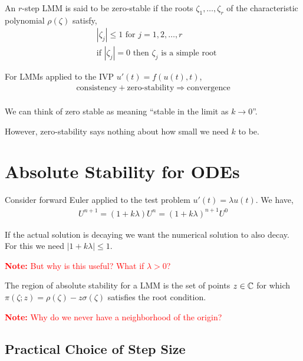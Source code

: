 \documentclass[12pt]{article}
\newcommand{\note}[1]{\textcolor{red}{\textbf{Note:} #1}}
\begin{document}
\begin{definition}
An \( r \)-step LMM is said to be zero-stable if the roots \( \zeta_1, \ldots, \zeta_r \) of the characteristic polynomial \( \rho(\zeta) \) satisfy,
\begin{align*}
    &|\zeta_j| \leq 1 \text{ for } j=1,2,\ldots, r \\
    &\text{if }|\zeta_j| = 0 \text{ then } \zeta_j \text{ is a simple root}
\end{align*}
\end{definition}

\begin{theorem}
For LMMs applied to the IVP \( u'(t) = f(u(t),t) \),
\begin{align*}
    \text{consistency} + \text{zero-stability} \Longrightarrow \text{convergence} \\
\end{align*}
\end{theorem}

We can think of zero stable as meaning ``stable in the limit as \( k\to 0 \)''.

However, zero-stability says nothing about how small we need \( k \) to be. 

\section{Absolute Stability for ODEs}

Consider forward Euler applied to the test problem \( u'(t) = \lambda u(t) \). We have,
\begin{align*}
    U^{n+1}=(1+k\lambda)U^n = (1+k\lambda)^{n+1} U^0
\end{align*}

If the actual solution is decaying we want the numerical solution to also decay. For this we need \( |1+k\lambda| \leq 1 \).

\note{But why is this useful? What if \( \lambda > 0 \)?}

\begin{definition}
The region of absolute stability for a LMM is the set of points \( z\in\mathbb{C} \) for which \( \pi(\zeta;z) = \rho(\zeta) - z\sigma(\zeta) \) satisfies the root condition.
\end{definition}

\note{Why do we never have a neighborhood of the origin?}

\subsection{Practical Choice of Step Size}
\end{document}
